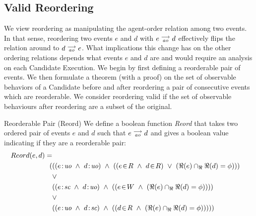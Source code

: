 

\subsection{Valid Reordering}
    
    We view reordering as manipulating the agent-order relation among two events. In that sense, reordering two events $e$ and $d$ with $e\stackrel{\longrightarrow}{_{\textit{ao}}}d$ effectively flips the relation around to $d\stackrel{\longrightarrow}{_{\textit{ao}}}e$.
    What implications this change has on the other ordering relations depends what events $e$ and $d$ are and would require an analysis on each Candidate Execution. We begin by first defining a reorderable pair of events. We then formulate a theorem (with a proof) on the set of observable behaviors of a Candidate before and after reordering a pair of consecutive events which are reorderable. We consider reordering valid if the set of observable behaviours after reordering are a subset of the original. 
    
    \begin{definition}{Reorderable Pair (Reord)} \label{def:reord}
        We define a boolean function \emph{Reord} that takes two ordered pair of events $e$ and $d$ such that $e\stackrel{\longrightarrow}{_{\textit{ao}}}d$ and gives a boolean value indicating if they are a reorderable pair:
         \begin{align*}
            Reord(e,d) = \\
            (
            &((\et{e}{uo} \ \wedge \ \et{d}{uo}) \ \wedge \ 
                    (   
                        (\event{e}{R} \ \wedge \ \event{d}{R}) \ \vee \ 
                        (\Re(e) \cap_\Re \Re(d) = \phi) 
                    )
            ) \\ &\vee \\
            &((\et{e}{sc} \ \wedge \ \et{d}{uo}) \ \wedge \ 
                    (
                        (\event{e}{W} \ \wedge \ (\Re(e) \cap_\Re \Re(d) = \phi)) 
                    )
            ) \\ &\vee \\
            &((\et{e}{uo} \ \wedge \ \et{d}{sc}) \ \wedge \ 
                    (
                        (\event{d}{R} \ \wedge \ (\Re(e) \cap_\Re \Re(d) = \phi)) 
                    )
            )
            )
        \end{align*}
    \end{definition}

